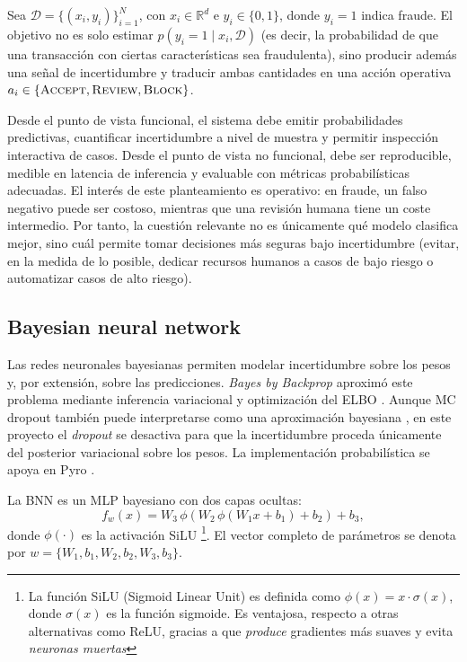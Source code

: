 \documentclass{article}
\begin{document}
Sea $\mathcal{D}=\{(x_i,y_i)\}_{i=1}^{N}$, con $x_i \in \mathbb{R}^{d}$ e $y_i \in \{0,1\}$,
donde $y_i=1$ indica fraude. El objetivo no es solo estimar
$p(y_i=1\mid x_i,\mathcal{D})$ (es decir, la probabilidad de que una transacción con ciertas características sea fraudulenta),
sino producir además una señal de incertidumbre y traducir ambas cantidades en una acción operativa
$a_i \in \{\textsc{Accept},\textsc{Review},\textsc{Block}\}$.

Desde el punto de vista funcional, el sistema debe emitir probabilidades predictivas, cuantificar incertidumbre a nivel de muestra y permitir inspección interactiva de casos. Desde el punto de vista no funcional, debe ser reproducible, medible en latencia de inferencia y evaluable con métricas probabilísticas adecuadas. El interés de este planteamiento es operativo: en fraude, un falso negativo puede ser costoso, mientras que una revisión humana tiene un coste intermedio. Por tanto, la cuestión relevante no es únicamente qué modelo clasifica mejor, sino cuál permite tomar decisiones más seguras bajo incertidumbre (evitar, en la medida de lo posible, dedicar recursos humanos a casos de bajo riesgo o automatizar casos de alto riesgo).

\subsection{Bayesian neural network}

Las redes neuronales bayesianas permiten modelar incertidumbre sobre los pesos y, por extensión, sobre las predicciones. \textit{Bayes by Backprop} aproximó este problema mediante inferencia variacional y optimización del ELBO \citep{blundell2015,kingma2014}. Aunque MC dropout también puede interpretarse como una aproximación bayesiana \citep{gal2016}, en este proyecto el \emph{dropout} se desactiva para que la incertidumbre proceda únicamente del posterior variacional sobre los pesos. La implementación probabilística se apoya en Pyro \citep{pyrosvi,pyroautoguide,pyropredictive}.

La BNN es un MLP bayesiano con dos capas ocultas:
\[
    f_w(x)=W_3\,\phi\!\left(W_2\,\phi\!\left(W_1x+b_1\right)+b_2\right)+b_3,
\]
donde $\phi(\cdot)$ es la activación SiLU \footnote{La función SiLU (Sigmoid Linear Unit) es definida como $\phi(x) = x \cdot \sigma(x)$, donde $\sigma(x)$ es la función sigmoide. Es ventajosa, respecto a otras alternativas como ReLU, gracias a que \textit{produce} gradientes más suaves y evita \textit{neuronas muertas}}. El vector completo de parámetros se denota por
$w=\{W_1,b_1,W_2,b_2,W_3,b_3\}$.
\end{document}
